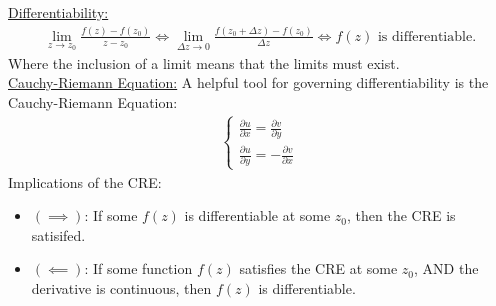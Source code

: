 \documentclass{article}
\newcommand{\gap}{\medskip\\}
\newcommand{\sheader}[1]{\underline{#1:}}
\begin{document}
    \sheader{Differentiability}
    \begin{align*}
        \lim_{z \to z_0} \frac{f(z) - f(z_0)}{z - z_0} \iff \lim_{\Delta z \to 0} \frac{f(z_0 + \Delta z) - f(z_0)}{\Delta z} \iff f(z) \textrm{ is differentiable.}
    \end{align*}
    Where the inclusion of a limit means that the limits must exist.
    \gap
    \sheader{Cauchy-Riemann Equation}
    A helpful tool for governing differentiability is the Cauchy-Riemann Equation:
    \begin{align*}
        \begin{cases}
            \frac{\partial u}{\partial x} = \frac{\partial v}{\partial y}\\
            \frac{\partial u}{\partial y} = -\frac{\partial v}{\partial x}
        \end{cases}
    \end{align*}
    Implications of the CRE:
    \begin{itemize}
        \item $(\implies)$: If some $f(z)$ is differentiable at some $z_0$, then 
        the CRE is satisifed.
        \item $(\impliedby)$: If some function $f(z)$ satisfies the CRE at some $z_0$,
        AND the derivative is continuous, then $f(z)$ is differentiable.
    \end{itemize}
\end{document}
